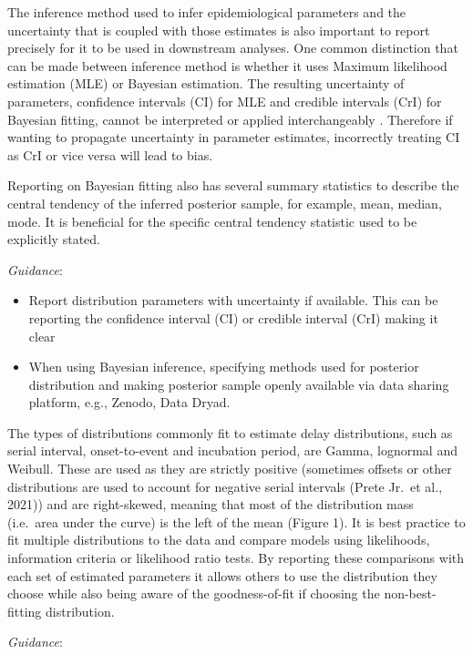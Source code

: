 \documentclass[
  10pt,
  letterpaper,
]{article}
\providecommand{\tightlist}{%
  \setlength{\itemsep}{0pt}\setlength{\parskip}{0pt}}\usepackage{longtable,booktabs,array}
\begin{document}
The inference method used to infer epidemiological parameters and the
uncertainty that is coupled with those estimates is also important to
report precisely for it to be used in downstream analyses. One common
distinction that can be made between inference method is whether it uses
Maximum likelihood estimation (MLE) or Bayesian estimation. The
resulting uncertainty of parameters, confidence intervals (CI) for MLE
and credible intervals (CrI) for Bayesian fitting, cannot be interpreted
or applied interchangeably \citep{moreyFallacyPlacingConfidence2016}.
Therefore if wanting to propagate uncertainty in parameter estimates,
incorrectly treating CI as CrI or vice versa will lead to bias.

Reporting on Bayesian fitting also has several summary statistics to
describe the central tendency of the inferred posterior sample, for
example, mean, median, mode. It is beneficial for the specific central
tendency statistic used to be explicitly stated.

\emph{Guidance}:

\begin{itemize}
\tightlist
\item
  Report distribution parameters with uncertainty if available. This can
  be reporting the confidence interval (CI) or credible interval (CrI)
  making it clear
\item
  When using Bayesian inference, specifying methods used for posterior
  distribution and making posterior sample openly available via data
  sharing platform, e.g., Zenodo, Data Dryad.
\end{itemize}

The types of distributions commonly fit to estimate delay distributions,
such as serial interval, onset-to-event and incubation period, are
Gamma, lognormal and Weibull. These are used as they are strictly
positive (sometimes offsets or other distributions are used to account
for negative serial intervals (Prete Jr.~et al., 2021)) and are
right-skewed, meaning that most of the distribution mass (i.e.~area
under the curve) is the left of the mean (Figure 1). It is best practice
to fit multiple distributions to the data and compare models using
likelihoods, information criteria or likelihood ratio tests. By
reporting these comparisons with each set of estimated parameters it
allows others to use the distribution they choose while also being aware
of the goodness-of-fit if choosing the non-best-fitting distribution.

\emph{Guidance}:
\end{document}
